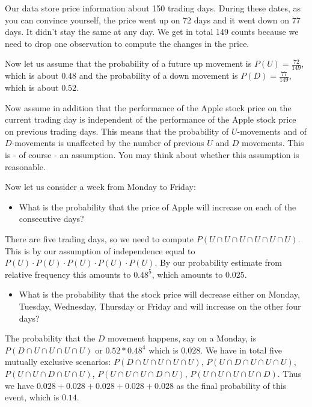 \documentclass[
]{book}
\providecommand{\tightlist}{%
  \setlength{\itemsep}{0pt}\setlength{\parskip}{0pt}}
\begin{document}
Our data store price information about 150 trading days. During these dates, as you can
convince yourself, the price went up on 72 days and it went down on 77 days. It didn't
stay the same at any day. We get in total 149 counts because we need to drop one observation
to compute the changes in the price.

Now let us assume that the probability of a future up movement is \(P(U) = \frac{72}{149}\), which
is about \(0.48\) and the probability of a down movement is \(P(D) = \frac{77}{149}\), which is
about \(0.52\).

Now assume in addition that the performance of the Apple stock price on the current trading day is
independent of the performance of the Apple stock price on previous trading days. This means
that the probability of \(U\)-movements and of \(D\)-movements is unaffected by the number of
previous \(U\) and \(D\) movements. This is - of course - an assumption. You may think about
whether this assumption is reasonable.

Now let us consider a week from Monday to Friday:

\begin{itemize}
\tightlist
\item
  What is the probability that the price of
  Apple will increase on each of the consecutive days?
\end{itemize}

There are five trading days, so we need to compute
\(P(U \cap U \cap U \cap U \cap U \cap U)\). This is by our assumption of independence equal
to \(P(U) \cdot P(U) \cdot P(U) \cdot P(U) \cdot P(U)\). By our probability estimate from
relative frequency this amounts to \(0.48^5\), which amounts to \(0.025\).

\begin{itemize}
\tightlist
\item
  What is the probability that the stock price will decrease either on Monday, Tuesday, Wednesday, Thursday or Friday and will increase on the other four days?
\end{itemize}

The probability that the \(D\) movement happens, say on a Monday, is
\(P(D \cap U \cap U \cap U \cap U)\) or \(0.52*0.48^4\) which is \(0.028\).
We have in total five mutually exclusive scenarios:
\(P(D \cap U \cap U \cap U \cap U)\), \(P(U \cap D \cap U \cap U \cap U)\),
\(P(U \cap U \cap D \cap U \cap U)\), \(P(U \cap U \cap U \cap D \cap U)\),
\(P(U \cap U \cap U \cap U \cap D)\). Thus we have \(0.028 + 0.028 + 0.028 + 0.028 + 0.028\)
as the final probability of this event, which is \(0.14\).
\end{document}
